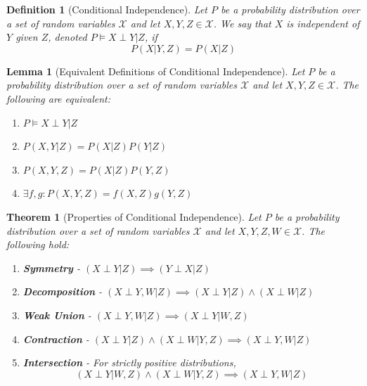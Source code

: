 \documentclass[11pt]{article}
\numberwithin{equation}{section}
\theoremstyle{boldStyle}
\theoremstyle{boldBlueStyle}
\newtheorem{lemma}{Lemma}[section]
\theoremstyle{boldPurpleStyle}
\newtheorem{theorem}{Theorem}[section]
\theoremstyle{boldRedStyle}
\newtheorem{definition}{Definition}[section]
\begin{document}
\begin{definition}[Conditional Independence]
    Let $P$ be a probability distribution over a set of random variables $\mathcal{X}$ and let $X, Y, Z \in \mathcal{X}$.
    We say that $X$ is independent of $Y$ given $Z$, denoted $P \models X \perp Y | Z$, if
    \begin{equation*}
        P(X | Y, Z) = P(X | Z)
    \end{equation*}
\end{definition}

\begin{lemma}[Equivalent Definitions of Conditional Independence]
    Let $P$ be a probability distribution over a set of random variables $\mathcal{X}$ and let $X, Y, Z \in \mathcal{X}$.
    The following are equivalent:
    \begin{enumerate}
        \item $P \models X \perp Y | Z$
        \item $P(X, Y | Z) = P(X | Z) P(Y | Z)$
        \item $P(X, Y, Z) = P(X | Z) P(Y , Z)$
        \item $\exists f, g : P(X, Y, Z) = f(X, Z)g(Y, Z)$
    \end{enumerate}
\end{lemma}

\begin{theorem}[Properties of Conditional Independence]
    Let $P$ be a probability distribution over a set of random variables $\mathcal{X}$ and let $X, Y, Z, W \in \mathcal{X}$.
    The following hold:
    \begin{enumerate}
        \item \textbf{Symmetry} - $(X \perp Y | Z) \implies (Y \perp X | Z)$
        \item \textbf{Decomposition} - $(X \perp Y, W | Z) \implies (X \perp Y | Z) \land (X \perp W | Z)$
        \item \textbf{Weak Union} - $(X \perp Y, W | Z) \implies (X \perp Y | W, Z)$
        \item \textbf{Contraction} - $(X \perp Y | Z) \land (X \perp W | Y, Z) \implies (X \perp Y, W | Z)$
        \item \textbf{Intersection} - For \textit{strictly positive} distributions, 
            \[(X \perp Y | W, Z) \land (X \perp W | Y, Z) \implies (X \perp Y, W | Z)\]
    \end{enumerate}
\end{theorem}
\end{document}
